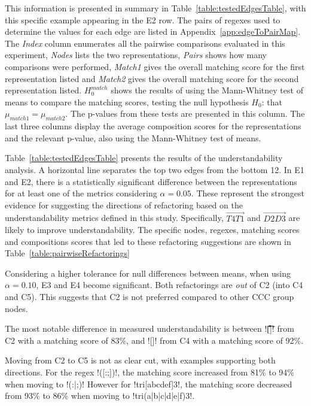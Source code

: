 This information is presented in summary in Table~\ref{table:testedEdgesTable}, with this specific example appearing in the E2 row. The pairs of regexes used to determine the values for each edge are listed in Appendix~\ref{app:edgeToPairMap}.  The \emph{Index} column enumerates all the pairwise comparisons evaluated in this experiment, \emph{Nodes} lists the two representations, \emph{Pairs} shows how many comparisons were performed, \emph{Match1} gives the overall matching score for the first representation listed and \emph{Match2} gives the overall matching score for the second representation listed. $H_0^{match}$ shows the results of using the Mann-Whitney test of means to compare the matching scores, testing the null hypothesis $H_0$: that $\mu_{match1} = \mu_{match2}$.  The p-values from these tests are presented in this column. The last three columns display the average composition scores for the representations and the relevant p-value, also using the Mann-Whitney test of means.



Table~\ref{table:testedEdgesTable} presents the results of the understandability analysis. A horizontal line separates the top two edges from the bottom 12. In E1 and E2, there is a statistically significant difference between the representations for at least one of the metrics considering $\alpha = 0.05$.  These represent the strongest evidence for suggesting the directions of refactoring based on the understandability metrics defined in this study. Specifically, $\overrightarrow{T4 T1}$ and $\overrightarrow{D2 D3}$ are likely to improve understandability.  The specific nodes, regexes, matching scores and compositions scores that led to these refactoring suggestions are shown in Table~\ref{table:pairwiseRefactorings}

Considering a higher tolerance for null differences between means, when using $\alpha = 0.10$, E3 and E4 become significant.  Both refactorings are \emph{out} of C2 (into C4 and C5).  This suggests that C2 is not preferred compared to other CCC group nodes.

The most notable difference in measured understandability is between \cverb![\t\r\f\n ]! from C2 with a matching score of 83\%, and \cverb![\s]! from C4 with a matching score of 92\%.

Moving from C2 to C5 is not as clear cut, with examples supporting both directions.  For the regex \cverb!([:;])!, the matching score increased from 81\% to 94\% when moving to \cverb!(:|;)!  However for \cverb!tri[abcdef]3!, the matching score decreased from 93\% to 86\% when moving to \cverb!tri(a|b|c|d|e|f)3!.

